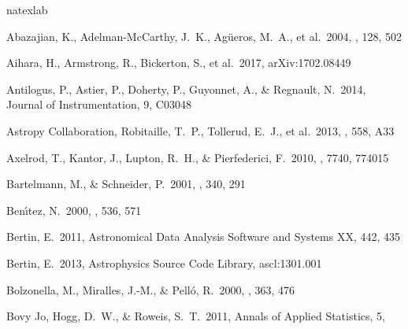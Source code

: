 \documentclass[useamsfonts]{pasj01}
\begin{document}


%



\begin{thebibliography}{}
    \label{sec:ref}
    \expandafter\ifx\csname natexlab\endcsname\relax\def\natexlab#1{#1}\fi

     Abazajian, K., Adelman-McCarthy,
             J.~K., Ag{\"u}eros, M.~A., et al.\ 2004, \aj, 128, 502

     Aihara, H., Armstrong, R., Bickerton, S.,
             et al.\ 2017, arXiv:1702.08449

     Antilogus, P., Astier, P.,
             Doherty, P., Guyonnet, A., \& Regnault, N.\ 2014, Journal of
             Instrumentation, 9, C03048

     Astropy Collaboration,
             Robitaille, T.~P., Tollerud, E.~J., et al.\ 2013, \aap, 558, A33

     Axelrod, T., Kantor, J., Lupton,
             R.~H., \& Pierfederici, F.\ 2010, \procspie, 7740, 774015

     Bartelmann, M., \&
             Schneider, P.\ 2001, \physrep, 340, 291

     Ben{\'{\i}}tez, N.\ 2000, \apj,
             536, 571

     Bertin, E.\ 2011, Astronomical Data Analysis
             Software and Systems XX, 442, 435

     Bertin, E.\ 2013, Astrophysics Source
             Code Library, ascl:1301.001

     Bolzonella, M., Miralles, J.-M.,
            \& Pell{\'o}, R.\ 2000, \aap, 363, 476

     Bovy Jo, Hogg, D.~W., \& Roweis,
             S.~T.\ 2011, Annals of Applied Statistics, 5,


\end{thebibliography}
\end{document}
